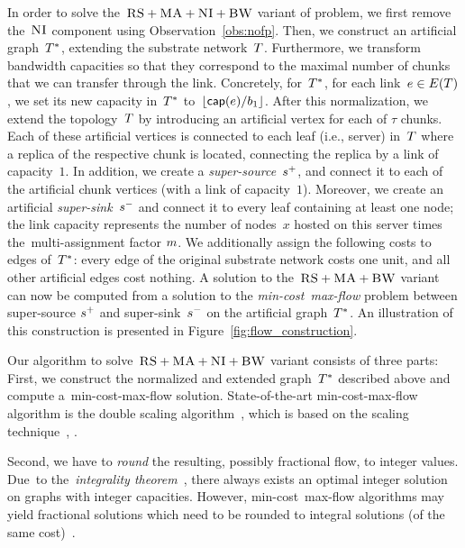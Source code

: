 In order to solve the~$\textsc{RS}+\textsc{MA}+\textsc{NI}+\textsc{BW}$ variant of {\CTE} problem,
we first remove the~$\textsc{NI}$ component using Observation~\ref{obs:nofp}.
Then, we construct
an artificial graph~$T^*$, extending the substrate network~$T$.
Furthermore, we transform bandwidth capacities so that they correspond to the maximal number of chunks that we can transfer through the link.
Concretely, for~$T^*$, for each link~$e\in E(T)$, we set its new
capacity in~$T^*$ to~$\lfloor\textsf{cap}(e) / b_1\rfloor$.
After this normalization, we extend the topology~$T$ by
introducing an artificial vertex for each of $\tau$ chunks. Each of these artificial
vertices is connected to each leaf (i.e., server) in~$T$ where a replica
 of the respective chunk is located,
connecting the replica by a link of capacity~$1$. In
addition, we create a
\emph{super-source}~$s^{+}$, and connect it to each of the artificial chunk
vertices (with a link of capacity~$1$). Moreover, we create an artificial \emph{super-sink}~$s^{-}$ and
connect it to every leaf containing at least one node; the link capacity represents
the number of nodes~$x$ hosted on this server times the~multi-assignment factor
$m$.
We additionally assign the following costs to edges of~$T^*$:
every edge of the original substrate network costs one unit, and all other artificial edges
cost nothing.
A solution to the~$\textsc{RS}+\textsc{MA}+\textsc{BW}$ variant can now be computed
from a solution to the \emph{min-cost~max-flow} problem between super-source
$s^{+}$ and
super-sink~$s^{-}$ on the artificial graph~$T^*$.
An illustration of this construction is presented in Figure~\ref{fig:flow_construction}.

Our algorithm to solve~$\textsc{RS}+\textsc{MA}+\textsc{NI}+\textsc{BW}$ variant consists of three parts:
First, we construct the normalized and extended graph~$T^*$
described above and compute
a~min-cost-max-flow solution.
State-of-the-art min-cost-max-flow algorithm is the double scaling algorithm~\cite{mincostmaxflow-state}, which is based on the scaling technique~\cite{mincostmaxflow-1,mincostmaxflow-2}, .

Second, we have to \emph{round} the resulting, possibly fractional flow, to
integer values. Due~to the~\emph{integrality theorem}~\cite{flow-book},
there always exists an optimal integer solution on graphs with integer capacities.
However, min-cost~max-flow algorithms may yield fractional solutions
which need to be rounded to integral solutions (of the same cost)~\cite{electric-flows}.

